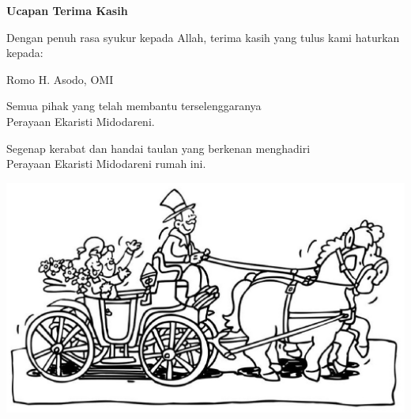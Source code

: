 \documentclass[12pt]{book}
\makeatletter
\newcommand{\judul}[1]{%
  {\parindent \z@ \centering \normalfont
    \interlinepenalty\@M \Large \bfseries #1\par\nobreak \vskip 20\p@ }}
\newcommand{\romo}{H. Asodo, OMI }
\makeatother
\begin{document}
\newpage
\thispagestyle{empty}
\judul{Ucapan Terima Kasih}
\begin{center}

Dengan penuh rasa syukur kepada Allah, terima kasih yang tulus kami haturkan kepada:

Romo \romo \vspace{0.5cm}

Semua pihak yang telah membantu terselenggaranya \\
Perayaan Ekaristi Midodareni.\vspace{0.5cm}

Segenap kerabat dan handai taulan yang berkenan menghadiri\\
Perayaan Ekaristi Midodareni rumah ini.\vspace{0.5cm}

\includegraphics[scale=0.5]{../pernikahan-perkawinan/wedding-carriage.ps}
\end{center}
\end{document}
